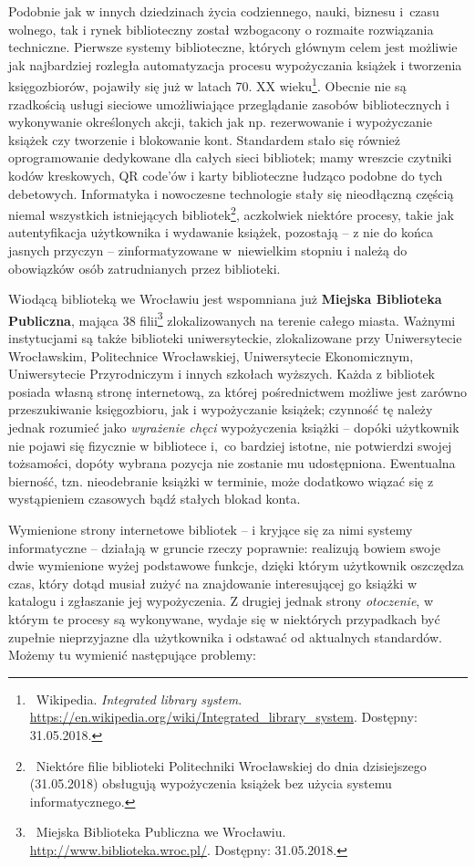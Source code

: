 \documentclass[12pt, a4paper]{article}
\begin{document}
Podobnie jak w innych dziedzinach życia codziennego, nauki, biznesu i~czasu wolnego, tak i rynek biblioteczny został wzbogacony o rozmaite rozwiązania techniczne. Pierwsze systemy biblioteczne, których głównym celem jest możliwie jak najbardziej rozległa automatyzacja procesu wypożyczania książek i tworzenia księgozbiorów, pojawiły się już w latach 70. XX wieku\footnote{\ Wikipedia. \textit{Integrated library system}. \url{https://en.wikipedia.org/wiki/Integrated_library_system}. Dostępny: 31.05.2018.}. Obecnie nie są rzadkością usługi sieciowe umożliwiające przeglądanie zasobów bibliotecznych i wykonywanie określonych akcji, takich jak np. rezerwowanie i wypożyczanie książek czy tworzenie i blokowanie kont. Standardem stało się również oprogramowanie dedykowane dla całych sieci bibliotek; mamy wreszcie czytniki kodów kreskowych, QR code'ów i karty biblioteczne łudząco podobne do tych debetowych. Informatyka i nowoczesne technologie stały się nieodłączną częścią niemal wszystkich istniejących bibliotek\footnote{\ Niektóre filie biblioteki Politechniki Wrocławskiej do dnia dzisiejszego (31.05.2018) obsługują wypożyczenia książek bez użycia systemu informatycznego.}, aczkolwiek niektóre procesy, takie jak autentyfikacja użytkownika i wydawanie książek, pozostają -- z nie do końca jasnych przyczyn -- zinformatyzowane w~niewielkim stopniu i należą do obowiązków osób zatrudnianych przez biblioteki.

Wiodącą biblioteką we Wrocławiu jest wspomniana już \textbf{Miejska Biblioteka Publiczna}, mająca 38 filii\footnote{\ Miejska Biblioteka Publiczna we Wrocławiu. \url{http://www.biblioteka.wroc.pl/}. Dostępny: 31.05.2018.} zlokalizowanych na terenie całego miasta. Ważnymi instytucjami są także biblioteki uniwersyteckie, zlokalizowane przy Uniwersytecie Wrocławskim, Politechnice Wrocławskiej, Uniwersytecie Ekonomicznym, Uniwersytecie Przyrodniczym i innych szkołach wyższych. Każda z bibliotek posiada własną stronę internetową, za której pośrednictwem możliwe jest zarówno przeszukiwanie księgozbioru, jak i wypożyczanie książek; czynność tę należy jednak rozumieć jako \textit{wyrażenie chęci} wypożyczenia książki -- dopóki użytkownik nie pojawi się fizycznie w bibliotece i,~co bardziej istotne, nie potwierdzi swojej tożsamości, dopóty wybrana pozycja nie zostanie mu udostępniona. Ewentualna bierność, tzn. nieodebranie książki w terminie, może dodatkowo wiązać się z wystąpieniem czasowych bądź stałych blokad konta.

Wymienione strony internetowe bibliotek -- i kryjące się za nimi systemy informatyczne -- działają w gruncie rzeczy poprawnie: realizują bowiem swoje dwie wymienione wyżej podstawowe funkcje, dzięki którym użytkownik oszczędza czas, który dotąd musiał zużyć na znajdowanie interesującej go książki w katalogu i zgłaszanie jej wypożyczenia. Z drugiej jednak strony \textit{otoczenie}, w którym te procesy są wykonywane, wydaje się w niektórych przypadkach być zupełnie nieprzyjazne dla użytkownika i odstawać od aktualnych standardów. Możemy tu wymienić następujące problemy:\\
\end{document}
